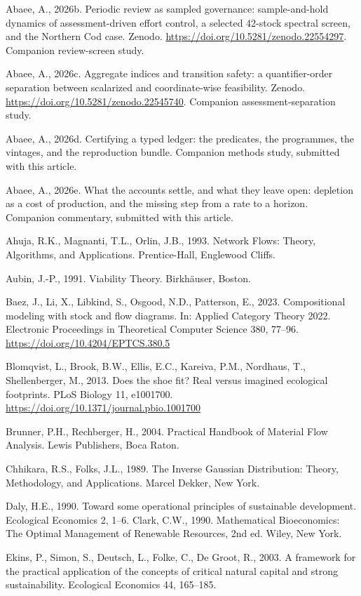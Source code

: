\documentclass[11pt]{article}
\begin{document}
Abaee, A., 2026b. Periodic review as sampled governance: sample-and-hold dynamics of assessment-driven effort control, a selected 42-stock spectral screen, and the Northern Cod case. Zenodo. \url{https://doi.org/10.5281/zenodo.22554297}. Companion review-screen study.

Abaee, A., 2026c. Aggregate indices and transition safety: a quantifier-order separation between scalarized and coordinate-wise feasibility. Zenodo. \url{https://doi.org/10.5281/zenodo.22545740}. Companion assessment-separation study.

Abaee, A., 2026d. Certifying a typed ledger: the predicates, the programmes, the vintages, and the reproduction bundle. Companion methods study, submitted with this article.

Abaee, A., 2026e. What the accounts settle, and what they leave open: depletion as a cost of production, and the missing step from a rate to a horizon. Companion commentary, submitted with this article.

Ahuja, R.K., Magnanti, T.L., Orlin, J.B., 1993. Network Flows: Theory, Algorithms, and Applications. Prentice-Hall, Englewood Cliffs.

Aubin, J.-P., 1991. Viability Theory. Birkh\"{a}user, Boston.

Baez, J., Li, X., Libkind, S., Osgood, N.D., Patterson, E., 2023. Compositional modeling with stock and flow diagrams. In: Applied Category Theory 2022. Electronic Proceedings in Theoretical Computer Science 380, 77--96. \url{https://doi.org/10.4204/EPTCS.380.5}

Blomqvist, L., Brook, B.W., Ellis, E.C., Kareiva, P.M., Nordhaus, T., Shellenberger, M., 2013. Does the shoe fit? Real versus imagined ecological footprints. PLoS Biology 11, e1001700. \url{https://doi.org/10.1371/journal.pbio.1001700}

Brunner, P.H., Rechberger, H., 2004. Practical Handbook of Material Flow Analysis. Lewis Publishers, Boca Raton.

Chhikara, R.S., Folks, J.L., 1989. The Inverse Gaussian Distribution: Theory, Methodology, and Applications. Marcel Dekker, New York.

Daly, H.E., 1990. Toward some operational principles of sustainable development. Ecological Economics 2, 1--6. Clark, C.W., 1990. Mathematical Bioeconomics: The Optimal Management of Renewable Resources, 2nd ed. Wiley, New York.

Ekins, P., Simon, S., Deutsch, L., Folke, C., De Groot, R., 2003. A framework for the practical application of the concepts of critical natural capital and strong sustainability. Ecological Economics 44, 165--185.
\end{document}
